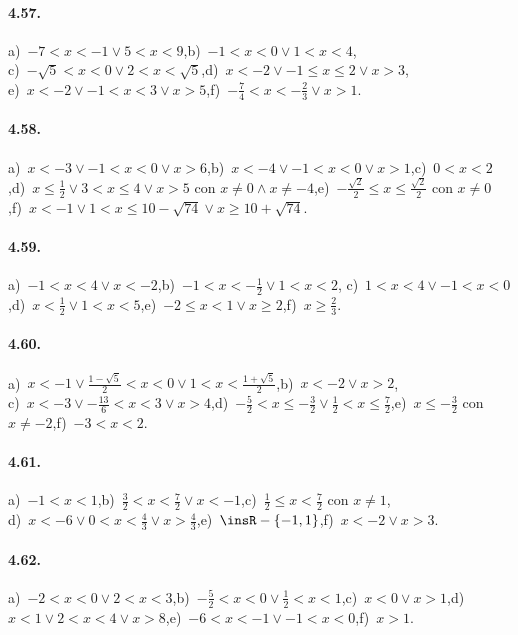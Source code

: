 \paragraph{4.57.} a)~$-7<x<-1\vee 5<x<9$,\quad b)~$-1<x<0\vee 1<x<4$,\protect\\
c)~$-\sqrt 5<x<0\vee 2<x<\sqrt 5$,\quad d)~$x<-2\vee -1\le x\le 2\vee x>3$,\protect\\
e)~$x<-2\vee -1<x<3\vee x>5$,\quad f)~$-\frac 7 4<x<-\frac 2 3\vee x>1$.

\paragraph{4.58.} a)~$x<-3\vee -1<x<0\vee x>6$,\quad b)~$x<-4\vee -1<x<0\vee x>1$,\quad c)~$0<x<2$,\quad d)~$x\le \frac 1 2\vee 3<x\le 4\vee x>5$ con $x\neq 0\wedge x\neq -4$,\quad e)~$-\frac{\sqrt 2} 2\le x\le \frac{\sqrt 2} 2$ con $x\neq 0$,\quad f)~$x<-1\vee 1<x\le 10-\sqrt{74}\vee x\ge 10+\sqrt{74}$.

\paragraph{4.59.} a)~$-1<x<4\vee x<-2$,\quad b)~$-1<x<-\frac{1}{2}\vee 1<x<2$,\quad
c)~$1<x<4\vee -1<x<0$,\quad d)~$x< \frac 1 2\vee 1<x<5$,\quad e)~$-2\le x<1\vee x\ge 2$,\quad f)~$x\ge \frac{2}{3}$.

\paragraph{4.60.} a)~$x<-1\vee \frac{1-\sqrt 5} 2<x<0\vee 1<x<\frac{1+\sqrt 5} 2$,\quad b)~$x<-2\vee x>2$,\protect\\
c)~$x<-3\vee -\frac{13} 6<x<3\vee x>4$,\quad d)~$-\frac 5 2<x\le -\frac 3 2\vee \frac 1 2<x\le \frac 7 2$,\quad e)~$x\le -\frac 3 2$ con $x\neq -2$,\quad f)~$-3<x<2$.

\paragraph{4.61.} a)~$-1<x<1$,\quad b)~$\frac 3 2<x<\frac 7 2\vee x<-1$,\quad c)~$\frac 1 2\le x<\frac 7 2$ con $x\neq 1$,\protect\\
d)~$x<-6\vee 0<x<\frac{4}{3}\vee x>\frac{4}{3}$,\quad e)~$\insR-\{-1,1\}$,\quad f)~$x<-2\vee x>3$.

\paragraph{4.62.} a)~$-2<x<0\vee 2<x<3$,\quad b)~$-\frac 5 2<x<0\vee \frac{1}{2}<x<1$,\quad c)~$x<0\vee x>1$,\quad d)~$x<1\vee 2<x<4\vee x>8$,\quad e)~$-6<x<-1\vee -1<x<0$,\quad f)~$x>1$.

